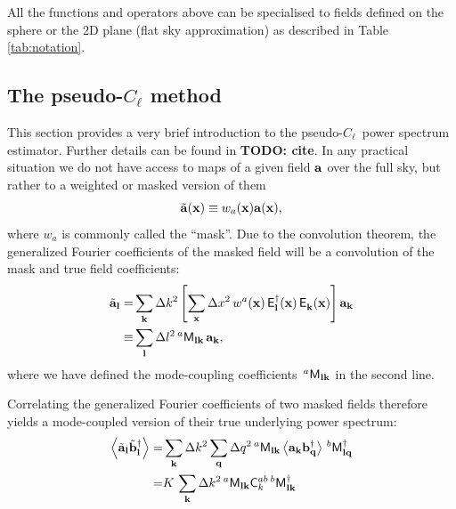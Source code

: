 \documentclass[a4paper,11pt]{article}
\newcommand{\todo}[1]{{\bf TODO: #1}}
\newcommand{\PCL}{pseudo-$C_\ell$~}
\newcommand{\summ}[1]{\sum_{\bf #1}\Delta #1^2}
\newcommand{\Ylm}[3]{{\sf E}^{#1}_{\bf #2}({\bf #3})}
\begin{document}
    All the functions and operators above can be specialised to fields defined on the sphere or the 2D plane (flat sky approximation) as described in Table \ref{tab:notation}.

  
  \subsection{The pseudo-$C_\ell$ method}
    This section provides a very brief introduction to the \PCL power spectrum estimator. Further details can be found in \todo{cite}. 
    In any practical situation we do not have access to maps of a given field ${\bf a}$ over the full sky, but rather to a weighted or masked version of them
    \begin{equation}
      \tilde{\bf a}({\bf x})\equiv w_a({\bf x}){\bf a}({\bf x}),
    \end{equation}
    where $w_a$ is commonly called the ``mask''. Due to the convolution theorem, the generalized Fourier coefficients of the masked field will be a convolution of the mask and true field coefficients:
    \begin{align}\nonumber
      \tilde{\bf a}_{\bf l}=&\summ{k}\left[\summ{x}\,w^a({\bf x})\,\Ylm{\dag}{l}{x}\,\Ylm{}{k}{x}\right]{\bf a}_{\bf k}\\
                      \equiv&\summ{l}\,^a{\sf M}_{{\bf l}{\bf k}}\,{\bf a}_{\bf k},
    \end{align}
    where we have defined the mode-coupling coefficients $\,^a{\sf M}_{{\bf l}{\bf k}}$ in the second line.
    
    Correlating the generalized Fourier coefficients of two masked fields therefore yields a mode-coupled version of their true underlying power spectrum:
    \begin{align}\nonumber
      \left\langle\tilde{\bf a}_{\bf l}\tilde{\bf b}^\dag_{\bf l}\right\rangle=&\summ{k}\summ{q}\,^a{\sf M}_{{\bf l}{\bf k}}\left\langle{\bf a}_{\bf k}{\bf b}^\dag_{\bf q}\right\rangle\,^b{\sf M}^\dag_{{\bf l}{\bf q}}\\
                                                                              =&K\,\summ{k}\,^a{\sf M}_{{\bf l}{\bf k}}{\sf C}^{ab}_k\,^b{\sf M}^\dag_{{\bf l}{\bf k}}
    \end{align}
    
\end{document}
